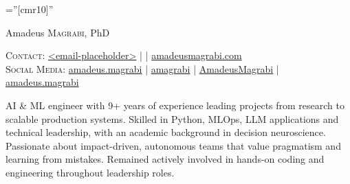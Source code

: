 \documentclass[a4paper,9.5pt]{article}
\begin{document}
\pagestyle{empty} %
\font\fb=''[cmr10]''

\par{\centering
		{\Large Amadeus \textsc{Magrabi}, PhD \\[5mm]
	}\par}


\begin{center}
  \textsc{Contact:} \small \href{mailto:<email-placeholder>}{<email-placeholder>} \space |  | \space \href{https://amadeusmagrabi.com}{amadeusmagrabi.com}\\
\vspace{1mm}
\textsc{Social Media:} \small 
{} \href{https://www.linkedin.com/in/amadeusmagrabi/}{amadeus.magrabi} \space | \space
{} \href{https://github.com/amagrabi}{amagrabi} \space | \space
{} \href{https://twitter.com/AmadeusMagrabi/}{AmadeusMagrabi} \space | \space
{} \href{https://medium.com/@amadeus.magrabi}{amadeus.magrabi}
\end{center}

\vspace{1mm}
\parbox{\linewidth}{\small 
AI \& ML engineer with 9+ years of experience leading projects from research to scalable production systems. 
Skilled in Python, MLOps, LLM applications and technical leadership, with an academic background in decision neuroscience.
Passionate about impact-driven, autonomous teams that value pragmatism and learning from mistakes.
Remained actively involved in hands-on coding and engineering throughout leadership roles.
}
\end{document}
